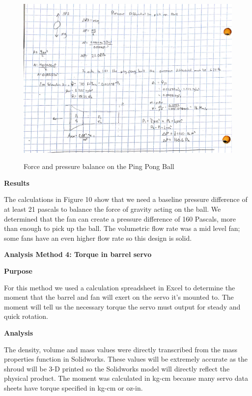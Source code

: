 \documentclass[12pt,letterpaper,titlepage]{article}
\begin{document}
\begin{figure}[H]
	\centering
	\includegraphics[width=\textwidth]{images/ballpickup}
	\label{fig:pickup}
	\caption{Force and pressure balance on the Ping Pong Ball}
\end{figure}

\smallskip\noindent\textbf{Results}

The calculations in Figure 10 show that we need a baseline pressure difference of at least 21 pascals to balance the force of gravity acting on the ball. We determined that the fan can create a pressure difference of 160 Pascals, more than enough to pick up the ball. The volumetric flow rate was a mid level fan; some fans have an even higher flow rate so this design is solid. 

\bigskip\noindent\textbf{Analysis Method 4: Torque in barrel servo}

\medskip\noindent\textbf{Purpose}

For this method we used a calculation spreadsheet in Excel to determine the moment that the barrel and fan will exert on the servo it's mounted to. The moment will tell us the necessary torque the servo must output for steady and quick rotation. 

\smallskip\noindent\textbf{Analysis}

The density, volume and mass values were directly transcribed from the mass properties function in Solidworks. These values will be extremely accurate as the shroud will be 3-D printed so the Solidworks model will directly reflect the physical product. The moment was calculated in kg-cm because many servo data sheets have torque specified in kg-cm or oz-in. 
\end{document}
